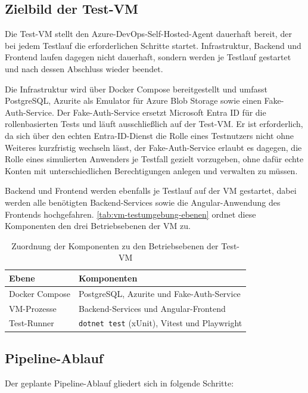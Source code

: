 \subsection{Zielbild der Test-VM}
Die Test-VM stellt den Azure-DevOps-Self-Hosted-Agent dauerhaft bereit, der bei jedem Testlauf die erforderlichen Schritte startet. Infrastruktur, Backend und Frontend laufen dagegen nicht dauerhaft, sondern werden je Testlauf gestartet und nach dessen Abschluss wieder beendet.

Die Infrastruktur wird über Docker Compose bereitgestellt und umfasst PostgreSQL, Azurite als Emulator für Azure Blob Storage sowie einen Fake-Auth-Service. Der Fake-Auth-Service ersetzt Microsoft Entra ID für die rollenbasierten Tests und läuft ausschließlich auf der Test-VM. Er ist erforderlich, da sich über den echten Entra-ID-Dienst die Rolle eines Testnutzers nicht ohne Weiteres kurzfristig wechseln lässt, der Fake-Auth-Service erlaubt es dagegen, die Rolle eines simulierten Anwenders je Testfall gezielt vorzugeben, ohne dafür echte Konten mit unterschiedlichen Berechtigungen anlegen und verwalten zu müssen.

Backend und Frontend werden ebenfalls je Testlauf auf der VM gestartet, dabei werden alle benötigten Backend-Services sowie die Angular-Anwendung des Frontends hochgefahren. \autoref{tab:vm-testumgebung-ebenen} ordnet diese Komponenten den drei Betriebsebenen der VM zu.

\begin{table}[H]
\centering
\caption{Zuordnung der Komponenten zu den Betriebsebenen der Test-VM}
\label{tab:vm-testumgebung-ebenen}
\begin{tabularx}{\textwidth}{@{}lX@{}}
\toprule
\textbf{Ebene} & \textbf{Komponenten} \\
\midrule
Docker Compose & PostgreSQL, Azurite und Fake-Auth-Service \\
\addlinespace
VM-Prozesse & Backend-Services und Angular-Frontend \\
\addlinespace
Test-Runner & \texttt{dotnet test} (xUnit), Vitest und Playwright \\
\bottomrule
\end{tabularx}
\end{table}

\subsection{Pipeline-Ablauf}
Der geplante Pipeline-Ablauf gliedert sich in folgende Schritte:

